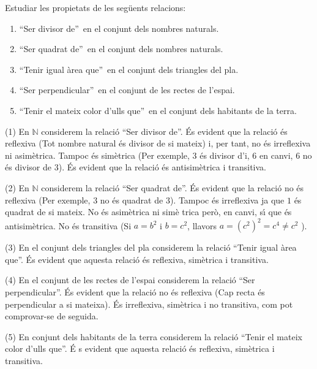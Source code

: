 \begin{exer}
Estudiar les propietats de les seg\"{u}ents relacions:

\begin{enumerate}
\item \textquotedblleft Ser divisor de\textquotedblright\ en el conjunt dels
nombres naturals.

\item \textquotedblleft Ser quadrat de\textquotedblright\ en el conjunt dels
nombres naturals.

\item \textquotedblleft Tenir igual \`{a}rea que\textquotedblright\ en el
conjunt dels triangles del pla.

\item \textquotedblleft Ser perpendicular\textquotedblright\ en el conjunt
de les rectes de l'espai.

\item \textquotedblleft Tenir el mateix color d'ulls que\textquotedblright\
en el conjunt dels habitants de la terra.
\end{enumerate}
\end{exer}

\begin{solucio}
(1) En $\mathbb{N}$ considerem la relaci\'{o} \textquotedblleft Ser divisor
de\textquotedblright . \'{E}s evident que la relaci\'{o} \'{e}s reflexiva
(Tot nombre natural \'{e}s divisor de si mateix) i, per tant, no \'{e}s
irreflexiva ni asim\`{e}trica. Tampoc \'{e}s sim\`{e}trica (Per exemple, $3$
\'{e}s divisor d'i, $6$ en canvi, $6$ no \'{e}s divisor de $3$). \'{E}s
evident que la relaci\'{o} \'{e}s antisim\`{e}trica i transitiva.

(2) En $\mathbb{N}$ considerem la relaci\'{o} \textquotedblleft Ser quadrat
de\textquotedblright . \'{E}s evident que la relaci\'{o} no \'{e}s reflexiva
(Per exemple, $3$ no \'{e}s quadrat de $3$). Tampoc \'{e}s irreflexiva ja
que $1$ \'{e}s quadrat de si mateix. No \'{e}s asim\`{e}trica ni sim\`{e}%
trica per\`{o}, en canvi, s\'{\i} que \'{e}s antisim\`{e}trica. No \'{e}s
transitiva (Si $a=b^{2}$ i $b=c^{2}$, llavors $a=(c^{2})^{2}=c^{4}\neq c^{2}$%
).

(3) En el conjunt dels triangles del pla considerem la relaci\'{o}
\textquotedblleft Tenir igual \`{a}rea que\textquotedblright . \'{E}s
evident que aquesta relaci\'{o} \'{e}s reflexiva, sim\`{e}trica i transitiva.

(4) En el conjunt de les rectes de l'espai considerem la relaci\'{o}
\textquotedblleft Ser perpendicular\textquotedblright . \'{E}s evident que
la relaci\'{o} no \'{e}s reflexiva (Cap recta \'{e}s perpendicular a si
mateixa). \'{E}s irreflexiva, sim\`{e}trica i no transitiva, com pot
comprovar-se de seguida.

(5) En conjunt dels habitants de la terra considerem la relaci\'{o}
\textquotedblleft Tenir el mateix color d'ulls que\textquotedblright . \'{E}%
s evident que aquesta relaci\'{o} \'{e}s reflexiva, sim\`{e}trica i
transitiva.
\end{solucio}

